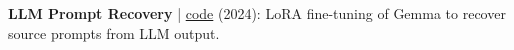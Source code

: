 \item \textbf{LLM Prompt Recovery} | \href{https://github.com/Rontor3}{code} (2024): LoRA fine-tuning of Gemma to recover source prompts from LLM output.
